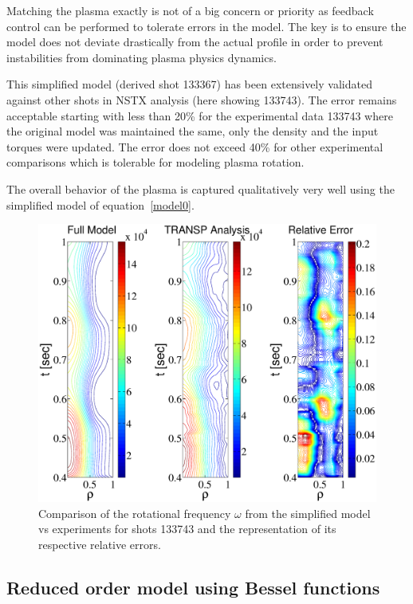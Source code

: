 \documentclass[12pt]{iopart}
\begin{document}
Matching the plasma exactly is not of a big concern or priority as feedback control can be performed to tolerate errors in the model. The key is to ensure the model does not deviate drastically from the actual profile in order to prevent instabilities from dominating plasma physics dynamics.

This simplified model (derived shot 133367) has been extensively validated against other shots in NSTX analysis (here showing 133743). The error remains acceptable starting with less than 20\% for the  experimental data 133743 where the original model was maintained the same, only the density and the input torques were updated. The error does not exceed 40\% for other experimental comparisons which is tolerable for modeling plasma rotation.

The overall behavior of the plasma is captured qualitatively very well using the simplified model of equation~\ref{model0}. 

\begin{figure}
\includegraphics[width=\linewidth]{imene_figs/bessel_comp} %
\caption{Comparison of the rotational frequency $\omega$ from the simplified model vs experiments for shots 133743  and the representation of its respective relative errors.}
\label{fig10}
\end{figure}

\subsection{Reduced order model using Bessel functions}
\end{document}
